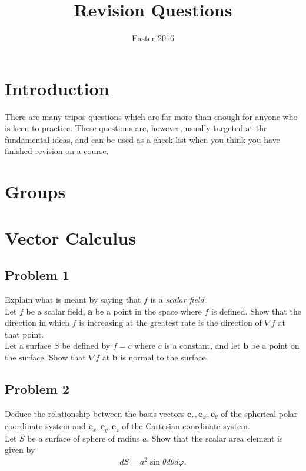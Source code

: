 \documentclass[a4paper]{article}
\begin{document}
\title{Revision Questions}
\date{Easter 2016}

\maketitle

\newpage

\tableofcontents

\newpage

\section{Introduction}
There are many tripos questions which are far more than enough for anyone who is keen to practice. These questions are, however, usually targeted at the fundamental ideas, and can be used as a check list when you think you have finished revision on a course.

\newpage

\section{Groups}

\newpage

\section{Vector Calculus}

\subsection{Problem 1}
Explain what is meant by saying that $f$ is a \emph{scalar field}.\\
Let $f$ be a scalar field, $\mathbf{a}$ be a point in the space where $f$ is defined. Show that the direction in which $f$ is increasing at the greatest rate is the direction of $\nabla f$ at that point.\\
Let a surface $S$ be defined by $f=c$ where $c$ is a constant, and let $\mathbf{b}$ be a point on the surface. Show that $\nabla f$ at $\mathbf{b}$ is normal to the surface.

\subsection{Problem 2}
Deduce the relationship between the basis vectors $\mathbf{e}_r,\mathbf{e}_\varphi,\mathbf{e}_\theta$ of the spherical polar coordinate system and $\mathbf{e}_x,\mathbf{e}_y,\mathbf{e}_z$ of the Cartesian coordinate system.\\
Let $S$ be a surface of sphere of radius $a$. Show that the scalar area element is given by
\begin{equation*}
\begin{aligned}
dS = a^2 \sin\theta d\theta d\varphi.
\end{aligned}
\end{equation*}
\end{document}
